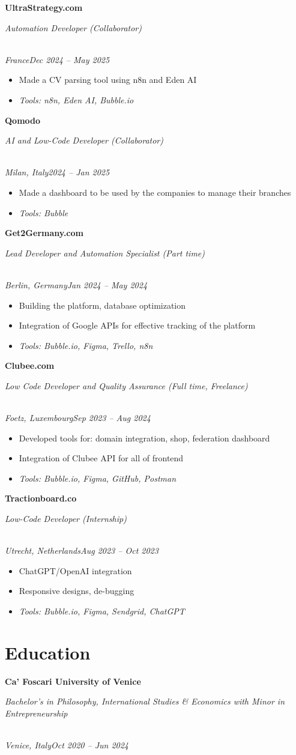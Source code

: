 \documentclass[a4paper,10pt]{article}
\newcommand{\role}[4]{\vspace{3pt}\noindent\hspace{0.6em}\parbox[t]{0.38\textwidth}{\raggedright\textbf{#1}}\hfill\parbox[t]{0.58\textwidth}{\raggedleft\textit{#2}}\\{\textit{#3}\hfill\textit{#4}}\vspace{1pt}}
\begin{document}
\role{UltraStrategy.com}{Automation Developer (Collaborator)}{France}{Dec 2024 -- May 2025}
\begin{itemize}
\item Made a CV parsing tool using n8n and Eden AI
\item \textit{Tools: n8n, Eden AI, Bubble.io}
\end{itemize}

\role{Qomodo}{AI and Low-Code Developer (Collaborator)}{Milan, Italy}{2024 -- Jan 2025}
\begin{itemize}
\item Made a dashboard to be used by the companies to manage their branches
\item \textit{Tools: Bubble}
\end{itemize}

\role{Get2Germany.com}{Lead Developer and Automation Specialist (Part time)}{Berlin, Germany}{Jan 2024 -- May 2024}
\begin{itemize}
\item Building the platform, database optimization
\item Integration of Google APIs for effective tracking of the platform
\item \textit{Tools: Bubble.io, Figma, Trello, n8n}
\end{itemize}

\role{Clubee.com}{Low Code Developer and Quality Assurance (Full time, Freelance)}{Foetz, Luxembourg}{Sep 2023 -- Aug 2024}
\begin{itemize}
\item Developed tools for: domain integration, shop, federation dashboard
\item Integration of Clubee API for all of frontend
\item \textit{Tools: Bubble.io, Figma, GitHub, Postman}
\end{itemize}

\role{Tractionboard.co}{Low-Code Developer (Internship)}{Utrecht, Netherlands}{Aug 2023 -- Oct 2023}
\begin{itemize}
\item ChatGPT/OpenAI integration
\item Responsive designs, de-bugging
\item \textit{Tools: Bubble.io, Figma, Sendgrid, ChatGPT}
\end{itemize}

\section{Education}
\role{Ca' Foscari University of Venice}{Bachelor's in Philosophy, International Studies \& Economics with Minor in Entrepreneurship}{Venice, Italy}{Oct 2020 -- Jun 2024}
\end{document}
